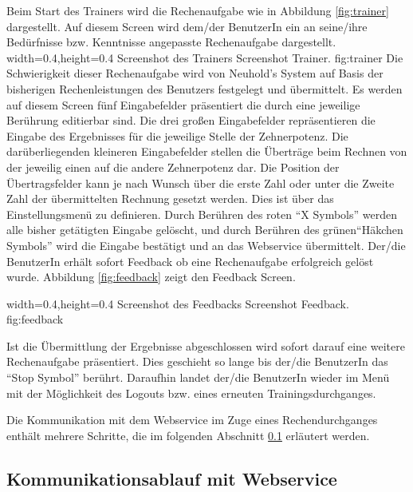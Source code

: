 Beim Start des Trainers wird die Rechenaufgabe wie in Abbildung \ref{fig:trainer} dargestellt. Auf diesem
Screen wird dem/der BenutzerIn ein an seine/ihre Bedürfnisse bzw. Kenntnisse angepasste Rechenaufgabe
dargestellt.
  {width=0.4\textwidth,height=0.4\textheight}%
  {Screenshot des Trainers}%
  {Screenshot Trainer.}%
  {fig:trainer}%
Die Schwierigkeit dieser Rechenaufgabe wird von Neuhold's System auf Basis der bisherigen
Rechenleistungen des Benutzers festgelegt und übermittelt. Es werden auf diesem Screen fünf Eingabefelder
präsentiert die durch eine jeweilige Berührung editierbar sind. Die drei großen Eingabefelder repräsentieren
die Eingabe des Ergebnisses für die jeweilige Stelle der Zehnerpotenz. Die darüberliegenden kleineren
Eingabefelder stellen die Überträge beim Rechnen von der jeweilig einen auf die andere Zehnerpotenz dar.
Die Position der Übertragsfelder kann je nach Wunsch über die erste Zahl oder unter die Zweite Zahl der übermittelten Rechnung 
gesetzt werden. Dies ist über das Einstellungsmenü zu definieren. Durch Berühren des roten \enquote{X Symbols} werden
alle bisher getätigten Eingabe gelöscht, und durch Berühren des grünen\enquote{Häkchen Symbols} wird die Eingabe 
bestätigt und an das Webservice übermittelt. Der/die BenutzerIn erhält sofort Feedback ob eine Rechenaufgabe
erfolgreich gelöst wurde. Abbildung \ref{fig:feedback} zeigt den Feedback Screen. 


  {width=0.4\textwidth,height=0.4\textheight}%
  {Screenshot des Feedbacks}%
  {Screenshot Feedback.}%
  {fig:feedback}%

Ist die Übermittlung der Ergebnisse abgeschlossen wird sofort darauf 
eine weitere Rechenaufgabe präsentiert. Dies geschieht so lange bis der/die BenutzerIn das \enquote{Stop Symbol} berührt. 
Daraufhin landet der/die BenutzerIn wieder im Menü mit der Möglichkeit des Logouts bzw. eines erneuten 
Trainingsdurchganges.

Die Kommunikation mit dem Webservice im Zuge eines Rechendurchganges enthält mehrere Schritte, die im folgenden 
Abschnitt \ref{subsec:communication} erläutert werden. 

\subsection{Kommunikationsablauf mit Webservice}
\label{subsec:communication}

